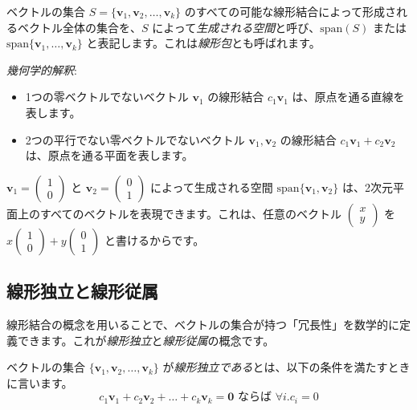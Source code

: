 \begin{dfn}
ベクトルの集合 $S = \{ \bm{v}_1, \bm{v}_2, \ldots, \bm{v}_k \}$ のすべての可能な線形結合によって形成されるベクトル全体の集合を、$S$ によって\emph{生成される空間}と呼び、$\text{span}(S)$ または $\text{span}\{\bm{v}_1, \ldots, \bm{v}_k\}$ と表記します。これは\emph{線形包}とも呼ばれます。
\end{dfn}

\emph{幾何学的解釈}:
\begin{itemize}
\item 1つの零ベクトルでないベクトル $\bm{v}_1$ の線形結合 $c_1 \bm{v}_1$ は、原点を通る直線を表します。
\item 2つの平行でない零ベクトルでないベクトル $\bm{v}_1, \bm{v}_2$ の線形結合 $c_1 \bm{v}_1 + c_2 \bm{v}_2$ は、原点を通る平面を表します。
\end{itemize}

\begin{ex}
$\bm{v}_1 = \begin{pmatrix} 1 \\ 0 \end{pmatrix}$ と $\bm{v}_2 = \begin{pmatrix} 0 \\ 1 \end{pmatrix}$ によって生成される空間 $\text{span}\{\bm{v}_1, \bm{v}_2\}$ は、2次元平面上のすべてのベクトルを表現できます。これは、任意のベクトル $\begin{pmatrix} x \\ y \end{pmatrix}$ を $x\begin{pmatrix} 1 \\ 0 \end{pmatrix} + y\begin{pmatrix} 0 \\ 1 \end{pmatrix}$ と書けるからです。
\end{ex}

\subsection{線形独立と線形従属}

線形結合の概念を用いることで、ベクトルの集合が持つ「冗長性」を数学的に定義できます。これが\emph{線形独立}と\emph{線形従属}の概念です。

\begin{dfn}[線形独立]
ベクトルの集合 $\{\bm{v}_1, \bm{v}_2, \ldots, \bm{v}_k\}$ が\emph{線形独立である}とは、以下の条件を満たすときに言います。
\[c_1 \bm{v}_1 + c_2 \bm{v}_2 + \dots + c_k \bm{v}_k = \bm{0}\text{ ならば }\forall i.c_i=0\]
\end{dfn}


